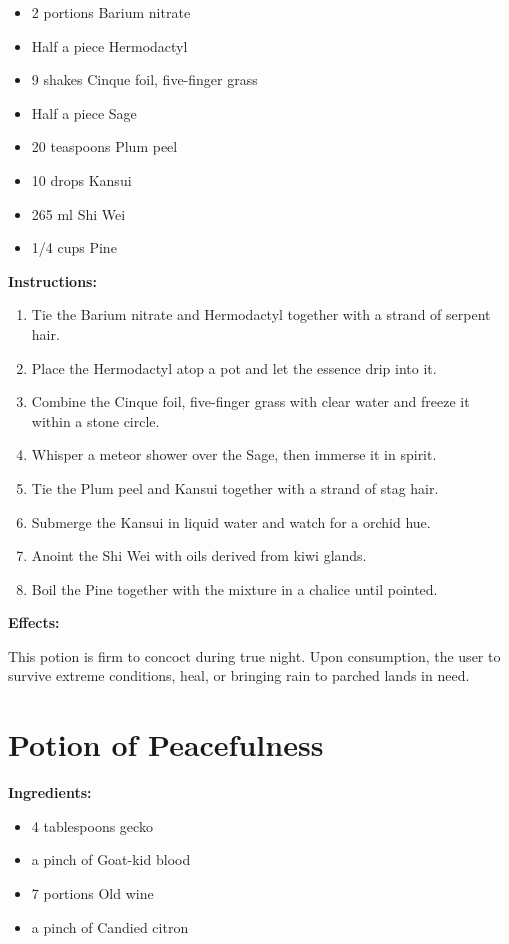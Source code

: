 \documentclass{article}
\begin{document}
\begin{itemize}
  \item 2 portions Barium nitrate
  \item Half a piece Hermodactyl
  \item 9 shakes Cinque foil, five-finger grass
  \item Half a piece Sage
  \item 20 teaspoons Plum peel
  \item 10 drops Kansui
  \item 265 ml Shi Wei
  \item 1/4 cups Pine
\end{itemize}

\textbf{Instructions:}

\begin{enumerate}
  \item Tie the Barium nitrate and Hermodactyl together with a strand of serpent hair.
  \item Place the Hermodactyl atop a pot and let the essence drip into it.
  \item Combine the Cinque foil, five-finger grass with clear water and freeze it within a stone circle.
  \item Whisper a meteor shower over the Sage, then immerse it in spirit.
  \item Tie the Plum peel and Kansui together with a strand of stag hair.
  \item Submerge the Kansui in liquid water and watch for a orchid hue.
  \item Anoint the Shi Wei with oils derived from kiwi glands.
  \item Boil the Pine together with the mixture in a chalice until pointed.
\end{enumerate}

\textbf{Effects:}

This potion is firm to concoct during true night. Upon consumption, the user to survive extreme conditions, heal, or bringing rain to parched lands in need.

\newpage
\section*{Potion of Peacefulness}

\textbf{Ingredients:}

\begin{itemize}
  \item 4 tablespoons gecko
  \item a pinch of Goat-kid blood
  \item 7 portions Old wine
  \item a pinch of Candied citron
\end{itemize}
\end{document}
